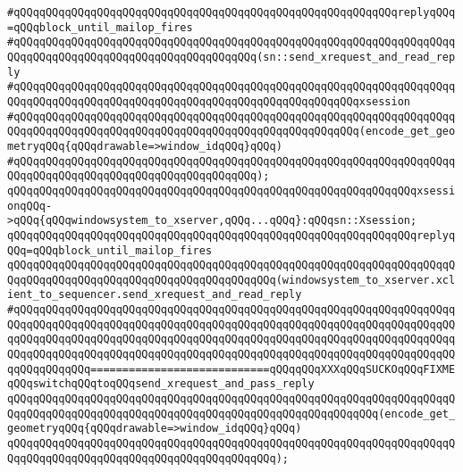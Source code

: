 \newline
\verb|#qQQqqQQqqQQqqQQqqQQqqQQqqQQqqQQqqQQqqQQqqQQqqQQqqQQqqQQqqQQqreplyqQQq=qQQqblock_until_mailop_fires|\newline
\verb|#qQQqqQQqqQQqqQQqqQQqqQQqqQQqqQQqqQQqqQQqqQQqqQQqqQQqqQQqqQQqqQQqqQQqqQQqqQQqqQQqqQQqqQQqqQQqqQQqqQQqqQQqqQQq(sn::send_xrequest_and_read_reply|\newline
\verb|#qQQqqQQqqQQqqQQqqQQqqQQqqQQqqQQqqQQqqQQqqQQqqQQqqQQqqQQqqQQqqQQqqQQqqQQqqQQqqQQqqQQqqQQqqQQqqQQqqQQqqQQqqQQqqQQqqQQqqQQqqQQqxsession|\newline
\verb|#qQQqqQQqqQQqqQQqqQQqqQQqqQQqqQQqqQQqqQQqqQQqqQQqqQQqqQQqqQQqqQQqqQQqqQQqqQQqqQQqqQQqqQQqqQQqqQQqqQQqqQQqqQQqqQQqqQQqqQQqqQQq(encode_get_geometryqQQq{qQQqdrawable=>window_idqQQq}qQQq)|\newline
\verb|#qQQqqQQqqQQqqQQqqQQqqQQqqQQqqQQqqQQqqQQqqQQqqQQqqQQqqQQqqQQqqQQqqQQqqQQqqQQqqQQqqQQqqQQqqQQqqQQqqQQqqQQqqQQq);|\newline
\newline
\verb|qQQqqQQqqQQqqQQqqQQqqQQqqQQqqQQqqQQqqQQqqQQqqQQqqQQqqQQqqQQqqQQqxsessionqQQq->qQQq{qQQqwindowsystem_to_xserver,qQQq...qQQq}:qQQqsn::Xsession;|\newline
\newline
\verb|qQQqqQQqqQQqqQQqqQQqqQQqqQQqqQQqqQQqqQQqqQQqqQQqqQQqqQQqqQQqqQQqreplyqQQq=qQQqblock_until_mailop_fires|\newline
\verb|qQQqqQQqqQQqqQQqqQQqqQQqqQQqqQQqqQQqqQQqqQQqqQQqqQQqqQQqqQQqqQQqqQQqqQQqqQQqqQQqqQQqqQQqqQQqqQQqqQQqqQQqqQQqqQQq(windowsystem_to_xserver.xclient_to_sequencer.send_xrequest_and_read_reply|\newline
\verb|#qQQqqQQqqQQqqQQqqQQqqQQqqQQqqQQqqQQqqQQqqQQqqQQqqQQqqQQqqQQqqQQqqQQqqQQqqQQqqQQqqQQqqQQqqQQqqQQqqQQqqQQqqQQqqQQqqQQqqQQqqQQqqQQqqQQqqQQqqQQqqQQqqQQqqQQqqQQqqQQqqQQqqQQqqQQqqQQqqQQqqQQqqQQqqQQqqQQqqQQqqQQqqQQqqQQqqQQqqQQqqQQqqQQqqQQqqQQqqQQqqQQqqQQqqQQqqQQqqQQqqQQqqQQqqQQqqQQqqQQqqQQqqQQqqQQq============================qQQqqQQqXXXqQQqSUCKOqQQqFIXMEqQQqswitchqQQqtoqQQqsend_xrequest_and_pass_reply|\newline
\verb|qQQqqQQqqQQqqQQqqQQqqQQqqQQqqQQqqQQqqQQqqQQqqQQqqQQqqQQqqQQqqQQqqQQqqQQqqQQqqQQqqQQqqQQqqQQqqQQqqQQqqQQqqQQqqQQqqQQqqQQqqQQqqQQq(encode_get_geometryqQQq{qQQqdrawable=>window_idqQQq}qQQq)|\newline
\verb|qQQqqQQqqQQqqQQqqQQqqQQqqQQqqQQqqQQqqQQqqQQqqQQqqQQqqQQqqQQqqQQqqQQqqQQqqQQqqQQqqQQqqQQqqQQqqQQqqQQqqQQqqQQqqQQq);|\newline
\newline

